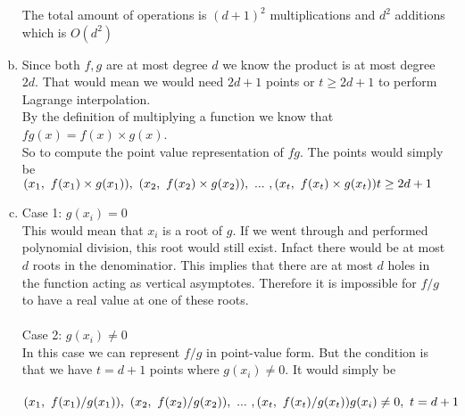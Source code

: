 \documentclass[11pt,letterpaper]{article}
\begin{document}
\begin{enumerate}[(a)]
The total amount of operations is $(d+1)^2$ multiplications and $d^2$ additions which is $O(d^2)$
\item
Since both $f,g$ are at most degree $d$ we know the product is at most degree $2d$. That would mean we would need $2d+1$ points or $t\geq 2d+1$ to perform Lagrange interpolation.\\
By the definition of multiplying a function we know that $fg(x) = f(x)\times g(x)$.\\
So to compute the point value representation of $fg$. The points would simply be\\
$(x_1,~f(x_1)\times g(x_1)),~(x_2,~f(x_2)\times g(x_2)),~...~,(x_t,~f(x_t)\times g(x_t))\hfill t\geq 2d+1$
\item
Case 1: $g(x_i) = 0$\\
This would mean that $x_i$ is a root of $g$. If we went through and performed polynomial division, this root would still exist. Infact there would be at most $d$ roots in the denominatior. This implies that there are at most $d$ holes in the function acting as vertical asymptotes. Therefore it is impossible for $f/g$ to have a real value at one of these roots.\\\\
Case 2: $g(x_i) \neq 0$\\
In this case we can represent $f/g$ in point-value form. But the condition is that we have $t = d+1$ points where $g(x_i) \neq 0$. It would simply be\\\\
$(x_1,~f(x_1)/g(x_1)),~(x_2,~f(x_2)/g(x_2)),~...~,(x_t,~f(x_t)/g(x_t))\hfill g(x_i)\neq 0,~t= d+1$


\end{enumerate}
\clearpage
\end{document}
